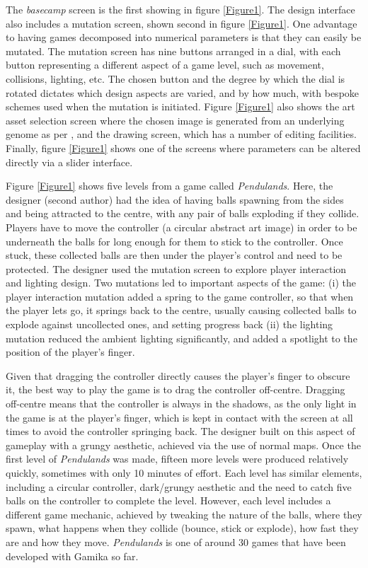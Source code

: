 \documentclass{IEEEtran}
\begin{document}
The \emph{basecamp} screen is the first showing in figure \ref{Figure1}. The design interface also includes a mutation screen, shown second in figure \ref{Figure1}. One advantage to having games decomposed into numerical parameters is that they can easily be mutated. The mutation screen has nine buttons arranged in a dial, with each button representing a different aspect of a game level, such as movement, collisions, lighting, etc. The chosen button and the degree by which the dial is rotated dictates which design aspects are varied, and by how much, with bespoke schemes used when the mutation is initiated. Figure \ref{Figure1} also shows the art asset selection screen where the chosen image is generated from an underlying genome as per \cite{colton:evomusart11}, and the drawing screen, which has a number of editing facilities. Finally, figure \ref{Figure1} shows one of the screens where parameters can be altered directly via a slider interface.

Figure \ref{Figure1} shows five levels from a game called
 \emph{Pendulands}. Here, the designer (second author) had the idea of having balls spawning from the sides and being attracted to the centre, with any pair of balls exploding if they collide. Players have to move the controller (a circular abstract art image) in order to be underneath the balls for long enough for them to stick to the controller. Once stuck, these collected balls are then under the player's control and need to be protected. The designer used the mutation screen to explore player interaction and lighting design. Two mutations led to important aspects of the game: (i) the player interaction mutation added a spring to the game controller, so that when the player lets go, it springs back to the centre, usually causing collected balls to explode against uncollected ones, and setting progress back (ii) the lighting mutation reduced the ambient lighting significantly, and added a spotlight to the position of the player's finger.
 
Given that dragging the controller directly causes the player's finger to obscure it, the best way to play the game is to drag the controller off-centre. Dragging off-centre means that the controller is always in the shadows, as the only light in the game is at the player's finger, which is kept in contact with the screen at all times to avoid the controller springing back. The designer built on this aspect of gameplay with a grungy aesthetic, achieved via the use of normal maps. Once the first level of \emph{Pendulands} was made, fifteen more levels were produced relatively quickly, sometimes with only 10 minutes of effort. Each level has similar elements, including a circular controller, dark/grungy aesthetic and the need to catch five balls on the controller to complete the level. However, each level includes a different game mechanic, achieved by tweaking the nature of the balls, where they spawn, what happens when they collide (bounce, stick or explode), how fast they are and how they move. \emph{Pendulands} is one of around 30 games that have been developed with Gamika so far.
\end{document}
